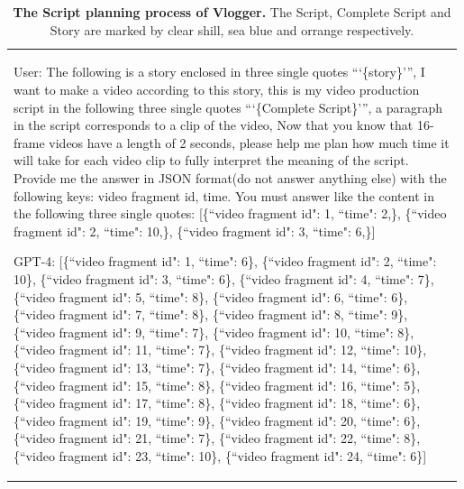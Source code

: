 \begin{table}[h!]\centering
    \begin{minipage}{0.98\linewidth}\vspace{0mm}    
    \centering
    \begin{tcolorbox} 
        \centering
        \begin{tabular}{p{0.99\linewidth}}
        \begin{minipage}{0.99\linewidth}
User: The following is a story enclosed in three single quotes ```\{\textcolor[RGB]{243, 156, 18}{story}\}''', I want to make a video according to this story, this is my video production script in the following three single quotes ```\{\textcolor[RGB]{52, 152, 219}{Complete Script}\}''', a paragraph in the script corresponds to a clip of the video, Now that you know that 16-frame videos have a length of 2 seconds, please help me plan how much time it will take for each video clip to fully interpret the meaning of the script. Provide me the answer in JSON format(do not answer anything else) with the following keys: video fragment id, time. You must answer like the content in the following three single quotes: [\{``video fragment id": 1, ``time": 2,\}, \{``video fragment id": 2, ``time": 10,\}, \{``video fragment id": 3, ``time": 6,\}]

GPT-4: \textcolor[RGB]{30, 144, 255}{[\{``video fragment id": 1, ``time": 6\}, \{``video fragment id": 2, ``time": 10\}, \{``video fragment id": 3, ``time": 6\}, \{``video fragment id": 4, ``time": 7\}, \{``video fragment id": 5, ``time": 8\}, \{``video fragment id": 6, ``time": 6\}, \{``video fragment id": 7, ``time": 8\}, \{``video fragment id": 8, ``time": 9\}, \{``video fragment id": 9, ``time": 7\}, \{``video fragment id": 10, ``time": 8\}, \{``video fragment id": 11, ``time": 7\}, \{``video fragment id": 12, ``time": 10\}, \{``video fragment id": 13, ``time": 7\}, \{``video fragment id": 14, ``time": 6\}, \{``video fragment id": 15, ``time": 8\}, \{``video fragment id": 16, ``time": 5\}, \{``video fragment id": 17, ``time": 8\}, \{``video fragment id": 18, ``time": 6\}, \{``video fragment id": 19, ``time": 9\}, \{``video fragment id": 20, ``time": 6\}, \{``video fragment id": 21, ``time": 7\}, \{``video fragment id": 22, ``time": 8\}, \{``video fragment id": 23, ``time": 10\}, \{``video fragment id": 24, ``time": 6\}]}

 \end{minipage}
        \end{tabular}
    \end{tcolorbox}
    \vspace{-2mm}
    \caption{\textbf{The Script planning process of Vlogger.} The \textcolor[RGB]{30, 144, 255}{Script}, \textcolor[RGB]{52, 152, 219}{Complete Script} and \textcolor[RGB]{243, 156, 18}{Story} are marked by \textcolor[RGB]{30, 144, 255}{clear shill}, \textcolor[RGB]{52, 152, 219}{sea blue} and \textcolor[RGB]{243, 156, 18}{orrange} respectively.
    }
    \label{tab:instruction_4}
\end{minipage}
\end{table}